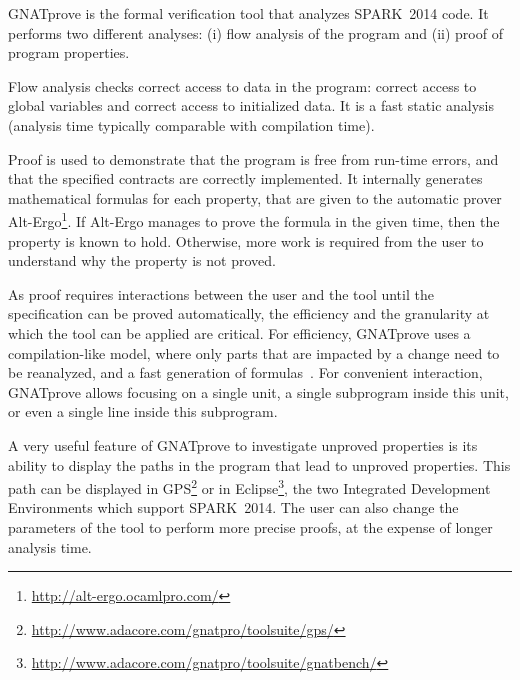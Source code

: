 \documentclass[10pt,a4paper,twocolumn]{article}
\newcommand{\DOC}{\textsc{do-178c}\xspace}
\newcommand{\gnatprove}{GNATprove\xspace}
\newcommand{\newspark}{SPARK~2014\xspace}
\newcommand{\altergo}{Alt-Ergo\xspace}
\begin{document}
\gnatprove is the formal verification tool that analyzes \newspark
code. It performs two different analyses: (i) flow analysis of the
program and (ii) proof of program properties.

Flow analysis checks correct access to data in the program: correct
access to global variables
and correct access to initialized data. It is a fast static analysis
(analysis time typically comparable with compilation time).

Proof is used to demonstrate that the program is free from run-time
errors, and that the specified contracts are correctly implemented. It
internally generates mathematical formulas for each property, that are
given to the automatic prover
\altergo\footnote{\url{http://alt-ergo.ocamlpro.com/}}. If \altergo
manages to prove the formula in the given time, then the property is
known to hold. Otherwise, more work is required from the user to
understand why the property is not proved.

As proof requires interactions between the user and the tool until the
specification can be proved automatically, the efficiency and the granularity
at which the tool can be applied are critical. For efficiency, \gnatprove uses
a compilation-like model, where only parts that are impacted by a change need
to be reanalyzed, and a fast generation of formulas~\cite{leino:2005:ipl}.
For convenient interaction, \gnatprove
allows focusing on a single unit, a single subprogram inside this unit, or even
a single line inside this subprogram.

A very useful feature of \gnatprove to investigate unproved properties
is its ability to display the paths in the program that lead to
unproved properties. This path can be displayed in
GPS\footnote{\url{http://www.adacore.com/gnatpro/toolsuite/gps/}} or
in
Eclipse\footnote{\url{http://www.adacore.com/gnatpro/toolsuite/gnatbench/}},
the two Integrated Development Environments which support
\newspark. The user can also change the parameters of the tool to
perform more precise proofs, at the expense of longer analysis time.


\end{document}
